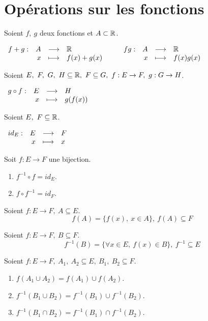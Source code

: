 \section{Opérations sur les fonctions}
\begin{definition}
	Soient $f,\ g$ deux fonctions et $A \subset \mathbb{R}$.
	\begin{center}
		$
		\begin{array}{rrcl} f+g : & A & \longrightarrow & \mathbb{R} \\ & x & \longmapsto & f(x)+g(x) \end{array}
		\qquad
		\begin{array}{rrcl} fg : & A & \longrightarrow & \mathbb{R} \\ & x & \longmapsto & f(x)g(x) \end{array}
		$
	\end{center}
\end{definition}

\begin{definition}
	Soient $E,\ F,\ G,\ H \subseteq \mathbb{R},\ F \subseteq G,\ f : E \to F,\ g : G \to H$.
	\begin{center}
		$
		\begin{array}{rrcl} g \circ f : & E & \longrightarrow & H \\ & x & \longmapsto & g(f(x)) \end{array}
		$
	\end{center}
\end{definition}

\begin{definition}
    Soient $E,\ F \subseteq \mathbb{R}$.
	\begin{center}
		$
		\begin{array}{rrcl} id_E : & E & \longrightarrow & F \\ & x & \longmapsto & x \end{array}
		$
	\end{center}
\end{definition}

\begin{proposition}
	Soit $f : E \to F$ une bijection.
    \begin{multicols}{2}
        \begin{enumerate}
            \item $f^{-1} \circ f = id_E$.
            \item $f \circ f^{-1} = id_F$.
        \end{enumerate}
    \end{multicols}
\end{proposition}

\begin{definition}
    Soient $f : E \to F,\ A \subseteq E$.
	\[ f(A) = \{ f(x),\ x \in A \},\ f(A) \subseteq F \]
\end{definition}

\begin{definition}
	Soient $f : E \to F,\ B \subseteq F$.
	\[ f^{-1}(B) = \{ \forall x \in E,\ f(x) \in B \},\ f^{-1} \subseteq E \]
\end{definition}

\begin{proposition}
    Soient $f : E \to F,\ A_1,\ A_2 \subseteq E,\ B_1,\ B_2 \subseteq F$.
    \begin{enumerate}
        \item $f(A_1 \cup A_2) = f(A_1) \cup f(A_2)$.
        \item $f^{-1} (B_1 \cup B_2) = f^{-1} (B_1) \cup f^{-1} (B_2)$.
        \item $f^{-1} (B_1 \cap B_2) = f^{-1} (B_1) \cap f^{-1} (B_2)$.
    \end{enumerate}
\end{proposition} 